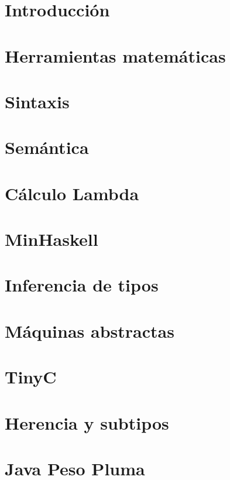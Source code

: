 \documentclass[8pt]{report}
\begin{document}
			
		
		\setcounter{page}{0}
			
			
		
		\tableofcontents
		\newpage\phantom{~}\newpage
		
		\setcounter{page}{0}    
		
		\chapter{Introducción}
		\label{sec:intro}
			
		
		\chapter{Herramientas matemáticas}
			
		
		\chapter{Sintaxis}
		\label{sec:sintax}
			
		
		\chapter{Semántica}
		\label{sec:semantics}
			
		
		\chapter{Cálculo Lambda}
			
		
		\chapter{\textsf{MinHaskell}}
			
		
		\chapter{Inferencia de tipos}
		
		\chapter{Máquinas abstractas}
		
		\chapter{TinyC}
		
		\chapter{Herencia y subtipos}
		
		\chapter{Java Peso Pluma}
		
		


	
\end{document}
